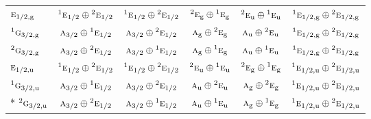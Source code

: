 \documentclass[10pt,a4paper]{article}
\numberwithin{equation}{section}
\newcommand{\irr}[1]{\text{\normalfont\scshape #1}}
\newcommand{\conjpair}[1]{{}^{#1}}
\newcommand{\ptag}[1]{\mathrm{#1}}
\begin{document}
{\begin{longtable}{@{}lccccc@{}}
$\irr{e}_{1/2,\ptag{g}}$ & $\conjpair{1}\irr{e}_{1/2}\oplus \conjpair{2}\irr{e}_{1/2}$ & $\conjpair{1}\irr{e}_{1/2}\oplus \conjpair{2}\irr{e}_{1/2}$ & $\conjpair{2}\irr{e}_{\ptag{g}}\oplus \conjpair{1}\irr{e}_{\ptag{g}}$ & $\conjpair{2}\irr{e}_{\ptag{u}}\oplus \conjpair{1}\irr{e}_{\ptag{u}}$ & $\conjpair{1}\irr{e}_{1/2,\ptag{g}}\oplus \conjpair{2}\irr{e}_{1/2,\ptag{g}}$\\
$\conjpair{1}\irr{g}_{3/2,\ptag{g}}$ & $\irr{a}_{3/2}\oplus \conjpair{1}\irr{e}_{1/2}$ & $\irr{a}_{3/2}\oplus \conjpair{2}\irr{e}_{1/2}$ & $\irr{a}_{\ptag{g}}\oplus \conjpair{2}\irr{e}_{\ptag{g}}$ & $\irr{a}_{\ptag{u}}\oplus \conjpair{2}\irr{e}_{\ptag{u}}$ & $\conjpair{1}\irr{e}_{1/2,\ptag{g}}\oplus \conjpair{2}\irr{e}_{1/2,\ptag{g}}$\\
$\conjpair{2}\irr{g}_{3/2,\ptag{g}}$ & $\irr{a}_{3/2}\oplus \conjpair{2}\irr{e}_{1/2}$ & $\irr{a}_{3/2}\oplus \conjpair{1}\irr{e}_{1/2}$ & $\irr{a}_{\ptag{g}}\oplus \conjpair{1}\irr{e}_{\ptag{g}}$ & $\irr{a}_{\ptag{u}}\oplus \conjpair{1}\irr{e}_{\ptag{u}}$ & $\conjpair{1}\irr{e}_{1/2,\ptag{g}}\oplus \conjpair{2}\irr{e}_{1/2,\ptag{g}}$\\
$\irr{e}_{1/2,\ptag{u}}$ & $\conjpair{1}\irr{e}_{1/2}\oplus \conjpair{2}\irr{e}_{1/2}$ & $\conjpair{1}\irr{e}_{1/2}\oplus \conjpair{2}\irr{e}_{1/2}$ & $\conjpair{2}\irr{e}_{\ptag{u}}\oplus \conjpair{1}\irr{e}_{\ptag{u}}$ & $\conjpair{2}\irr{e}_{\ptag{g}}\oplus \conjpair{1}\irr{e}_{\ptag{g}}$ & $\conjpair{1}\irr{e}_{1/2,\ptag{u}}\oplus \conjpair{2}\irr{e}_{1/2,\ptag{u}}$\\
$\conjpair{1}\irr{g}_{3/2,\ptag{u}}$ & $\irr{a}_{3/2}\oplus \conjpair{1}\irr{e}_{1/2}$ & $\irr{a}_{3/2}\oplus \conjpair{2}\irr{e}_{1/2}$ & $\irr{a}_{\ptag{u}}\oplus \conjpair{2}\irr{e}_{\ptag{u}}$ & $\irr{a}_{\ptag{g}}\oplus \conjpair{2}\irr{e}_{\ptag{g}}$ & $\conjpair{1}\irr{e}_{1/2,\ptag{u}}\oplus \conjpair{2}\irr{e}_{1/2,\ptag{u}}$\\*
$\conjpair{2}\irr{g}_{3/2,\ptag{u}}$ & $\irr{a}_{3/2}\oplus \conjpair{2}\irr{e}_{1/2}$ & $\irr{a}_{3/2}\oplus \conjpair{1}\irr{e}_{1/2}$ & $\irr{a}_{\ptag{u}}\oplus \conjpair{1}\irr{e}_{\ptag{u}}$ & $\irr{a}_{\ptag{g}}\oplus \conjpair{1}\irr{e}_{\ptag{g}}$ & $\conjpair{1}\irr{e}_{1/2,\ptag{u}}\oplus \conjpair{2}\irr{e}_{1/2,\ptag{u}}$\\
\bottomrule\end{longtable}}
\end{document}
